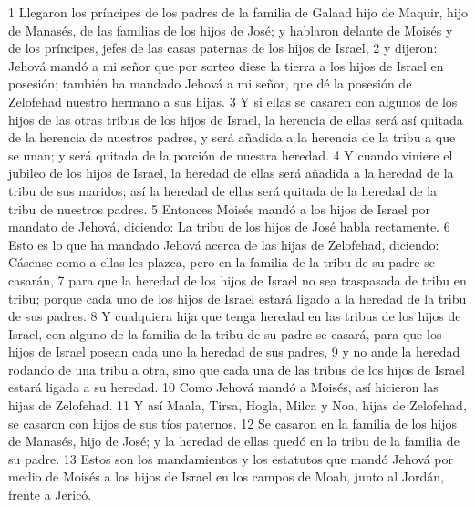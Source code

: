 1 Llegaron los príncipes de los padres de la familia de Galaad hijo de Maquir, hijo de Manasés, de las familias de los hijos de José; y hablaron delante de Moisés y de los príncipes, jefes de las casas paternas de los hijos de Israel,
2 y dijeron: Jehová mandó a mi señor que por sorteo diese la tierra a los hijos de Israel en posesión; también ha mandado Jehová a mi señor, que dé la posesión de Zelofehad nuestro hermano a sus hijas.
3 Y si ellas se casaren con algunos de los hijos de las otras tribus de los hijos de Israel, la herencia de ellas será así quitada de la herencia de nuestros padres, y será añadida a la herencia de la tribu a que se unan; y será quitada de la porción de nuestra heredad.
4 Y cuando viniere el jubileo de los hijos de Israel, la heredad de ellas será añadida a la heredad de la tribu de sus maridos; así la heredad de ellas será quitada de la heredad de la tribu de nuestros padres.
5 Entonces Moisés mandó a los hijos de Israel por mandato de Jehová, diciendo: La tribu de los hijos de José habla rectamente.
6 Esto es lo que ha mandado Jehová acerca de las hijas de Zelofehad, diciendo: Cásense como a ellas les plazca, pero en la familia de la tribu de su padre se casarán,
7 para que la heredad de los hijos de Israel no sea traspasada de tribu en tribu; porque cada uno de los hijos de Israel estará ligado a la heredad de la tribu de sus padres.
8 Y cualquiera hija que tenga heredad en las tribus de los hijos de Israel, con alguno de la familia de la tribu de su padre se casará, para que los hijos de Israel posean cada uno la heredad de sus padres,
9 y no ande la heredad rodando de una tribu a otra, sino que cada una de las tribus de los hijos de Israel estará ligada a su heredad.
10 Como Jehová mandó a Moisés, así hicieron las hijas de Zelofehad.
11 Y así Maala, Tirsa, Hogla, Milca y Noa, hijas de Zelofehad, se casaron con hijos de sus tíos paternos.
12 Se casaron en la familia de los hijos de Manasés, hijo de José; y la heredad de ellas quedó en la tribu de la familia de su padre.
13 Estos son los mandamientos y los estatutos que mandó Jehová por medio de Moisés a los hijos de Israel en los campos de Moab, junto al Jordán, frente a Jericó.


